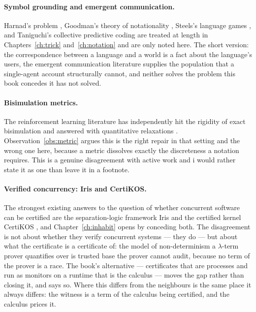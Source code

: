 \paragraph{Symbol grounding and emergent communication.}
Harnad's problem \cite{harnad1990}, Goodman's theory of
notationality \cite{goodman1968}, Steels's language games
\cite{steels2015}, and Taniguchi's collective predictive coding
\cite{taniguchi2024} are treated at length in
Chapters~\ref{ch:trick} and~\ref{ch:notation} and are only noted
here.
The short version: the correspondence between a language and a
world is a fact about the language's users, the emergent
communication literature supplies the population that a
single-agent account structurally cannot, and neither solves the
problem this book concedes it has not solved.

\paragraph{Bisimulation metrics.}
The reinforcement learning literature has independently hit the
rigidity of exact bisimulation and answered with quantitative
relaxations \cite{ferns2004,gelada2019,zhang2021,castro2021}.
Observation~\ref{obs:metric} argues this is the right repair in
that setting and the wrong one here, because a metric dissolves
exactly the discreteness a notation requires.
This is a genuine disagreement with active work and i would rather
state it as one than leave it in a footnote.

\paragraph{Verified concurrency: Iris and CertiKOS.}
The strongest existing answers to the question of whether concurrent
software can be certified are the separation-logic framework Iris
\cite{Iris} and the certified kernel CertiKOS \cite{CertiKOS}, and
Chapter~\ref{ch:inhabit} opens by conceding both.
The disagreement is not about whether they verify concurrent systems
--- they do --- but about what the certificate is a certificate of: the
model of non-determinism a $\lambda$-term prover quantifies over is
trusted base the prover cannot audit, because no term of the prover
is a race.
The book's alternative --- certificates that are processes and run as
monitors on a runtime that is the calculus --- moves the gap rather
than closing it, and says so.
Where this differs from the neighbours is the same place it always
differs: the witness is a term of the calculus being certified, and the
calculus prices it.

